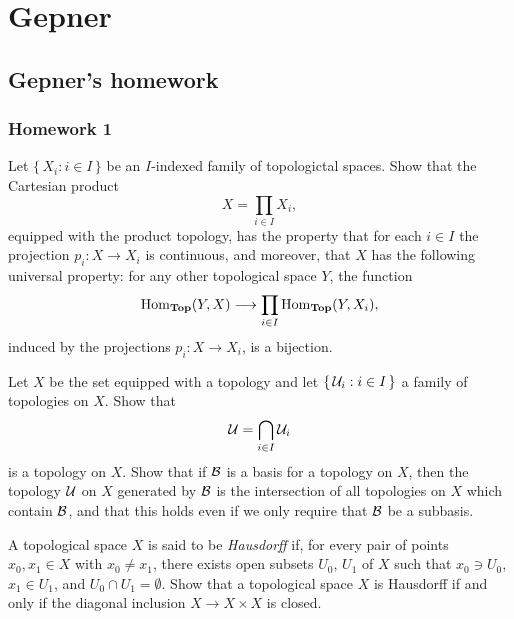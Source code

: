 \chapter{Gepner}
\section{Gepner's homework}
\subsection{Homework 1}
\begin{exercise}
  Let \(\{\,X_i:i\in I\,\}\) be an \(I\)-indexed family of topologictal
  spaces. Show that the Cartesian product
  \[
    X=\prod_{i\in I} X_i,
  \]
  equipped with the product topology, has the property that for each
  \(i\in I\) the projection \(p_i\colon X\to X_i\) is continuous, and
  moreover, that \(X\) has the following universal property: for any other
  topological space \(Y\), the function
  \[
    \operatorname{Hom}_{\mathbf{Top}}(Y,X)\longrightarrow\prod_{i\in I}\operatorname{Hom}_{\mathbf{Top}}(Y,X_i),
  \]
  induced by the projections \(p_i\colon X\to X_i\), is a bijection.
\end{exercise}
\begin{solution}
\end{solution}

\begin{exercise}
  Let \(X\) be the set equipped with a topology and let
  \(\{\,\mathcal{U}_i:i\in I\,\}\) a family of topologies on \(X\). Show that
  \[
    \mathcal{U}=\bigcap_{i\in I}\mathcal{U}_i
  \]
  is a topology on \(X\). Show that if \(\mathcal{B}\) is a basis for a topology
  on \(X\), then the topology \(\mathcal{U}\) on \(X\) generated by \(\mathcal{B}\) is
  the intersection of all topologies on \(X\) which contain \(\mathcal{B}\), and
  that this holds even if we only require that \(\mathcal{B}\) be a subbasis.
\end{exercise}
\begin{solution}
\end{solution}

\begin{exercise}
  A topological space \(X\) is said to be \emph{Hausdorff} if, for every
  pair of points \(x_0,x_1\in X\) with \(x_0\neq x_1\), there exists open
  subsets \(U_0\), \(U_1\) of \(X\) such that \(x_0\ni U_0\),
  \(x_1\in U_1\), and \(U_0\cap U_1=\emptyset\). Show that a topological
  space \(X\) is Hausdorff if and only if the diagonal inclusion
  \(X\to X\times X\) is closed.
\end{exercise}
\begin{solution}
\end{solution}

